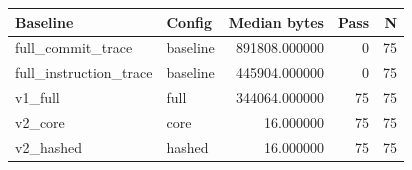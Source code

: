 \begin{tabular}{llrrr}
\toprule
Baseline & Config & Median bytes & Pass & N \\
\midrule
full\_commit\_trace & baseline & 891808.000000 & 0 & 75 \\
full\_instruction\_trace & baseline & 445904.000000 & 0 & 75 \\
v1\_full & full & 344064.000000 & 75 & 75 \\
v2\_core & core & 16.000000 & 75 & 75 \\
v2\_hashed & hashed & 16.000000 & 75 & 75 \\
\bottomrule
\end{tabular}
